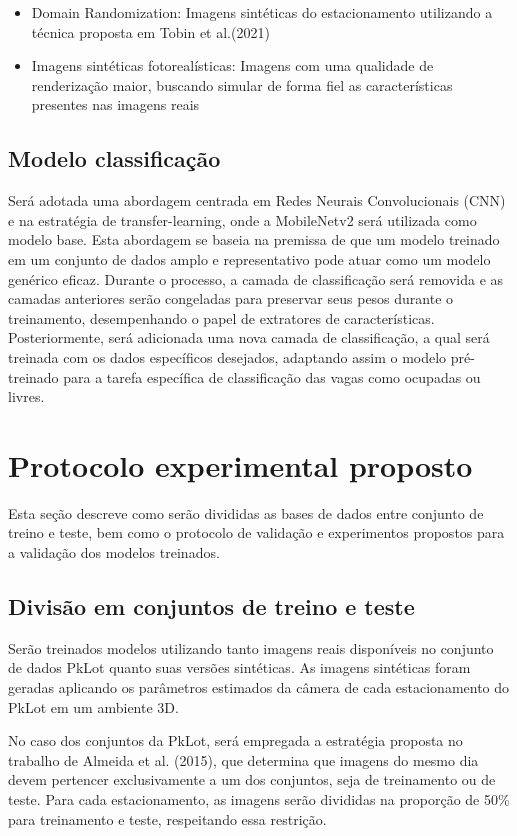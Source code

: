\begin{itemize}
    \item Domain Randomization: Imagens sintéticas do estacionamento utilizando a técnica proposta em Tobin et al.(2021)
    \item Imagens sintéticas fotorealísticas: Imagens com uma qualidade de renderização maior, buscando simular de forma fiel as características presentes nas imagens reais
\end{itemize}

\subsection{Modelo classificação}

Será adotada uma abordagem centrada em Redes Neurais Convolucionais (CNN) e na estratégia de transfer-learning, onde a MobileNetv2 será utilizada como modelo base. Esta abordagem se baseia na premissa de que um modelo treinado em um conjunto de dados amplo e representativo pode atuar como um modelo genérico eficaz. Durante o processo, a camada de classificação será removida e as camadas anteriores serão congeladas para preservar seus pesos durante o treinamento, desempenhando o papel de extratores de características. Posteriormente, será adicionada uma nova camada de classificação, a qual será treinada com os dados específicos desejados, adaptando assim o modelo pré-treinado para a tarefa específica de classificação das vagas como ocupadas ou livres.

\section{Protocolo experimental proposto}

Esta seção descreve como serão divididas as bases de dados entre conjunto de treino e teste, bem como o protocolo de validação e experimentos propostos para a validação dos modelos treinados.

\subsection{Divisão em conjuntos de treino e teste}


Serão treinados modelos utilizando tanto imagens reais disponíveis no conjunto de dados PkLot quanto suas versões sintéticas. As imagens sintéticas foram geradas aplicando os parâmetros estimados da câmera de cada estacionamento do PkLot em um ambiente 3D.

No caso dos conjuntos da PkLot, será empregada a estratégia proposta no trabalho de Almeida et al. (2015), que determina que imagens do mesmo dia devem pertencer exclusivamente a um dos conjuntos, seja de treinamento ou de teste. Para cada estacionamento, as imagens serão divididas na proporção de 50\% para treinamento e teste, respeitando essa restrição.

